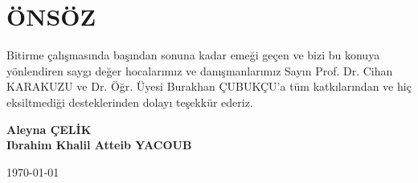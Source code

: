 \section*{ÖNSÖZ}
Bitirme çalışmasında başından sonuna kadar emeği geçen ve bizi bu konuya yönlendiren saygı değer hocalarımız ve danışmanlarımız Sayın Prof. Dr. Cihan KARAKUZU ve Dr. Öğr. Üyesi Burakhan ÇUBUKÇU'a tüm katkılarından ve hiç eksiltmediği desteklerinden dolayı teşekkür ederiz.

\begin{flushright}
\textbf{Aleyna ÇELİK \\ Ibrahim Khalil Atteib YACOUB}

\today
\end{flushright}